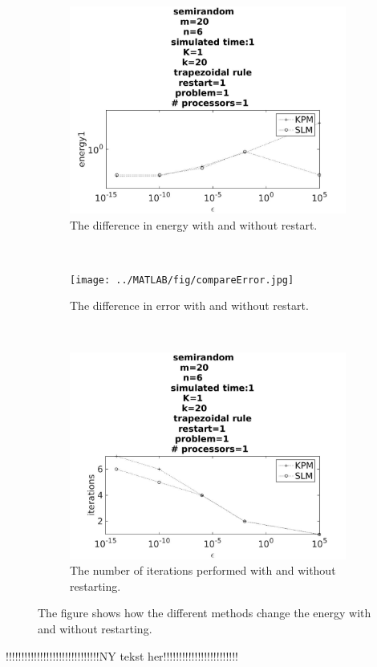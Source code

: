 \begin{figure}[H]
        \centering
        \begin{subfigure}[b]{0.3\textwidth}
                \includegraphics[width=\textwidth]{../MATLAB/fig/compareEnergy.jpg}
                \caption{ The difference in energy with and without restart. }
                \label{fig:compareEnergy}
        \end{subfigure}
        ~
        \begin{subfigure}[b]{0.3\textwidth}
                \texttt{[image: ../MATLAB/fig/compareError.jpg]}
                \caption{ The difference in error with and without restart. }
                \label{fig:compareError}
        \end{subfigure}
        ~
        \begin{subfigure}[b]{0.3\textwidth}
                \includegraphics[width=\textwidth]{../MATLAB/fig/compareIter.jpg}
                \caption{ The number of iterations performed with and without restarting.  }
                \label{fig:compareIter}
        \end{subfigure}
        \caption{ The figure shows how the different methods change the energy with and without restarting.  }
        \label{fig:compare}
\end{figure}
!!!!!!!!!!!!!!!!!!!!!!!!!!!!!!NY tekst her!!!!!!!!!!!!!!!!!!!!!!!!\\

